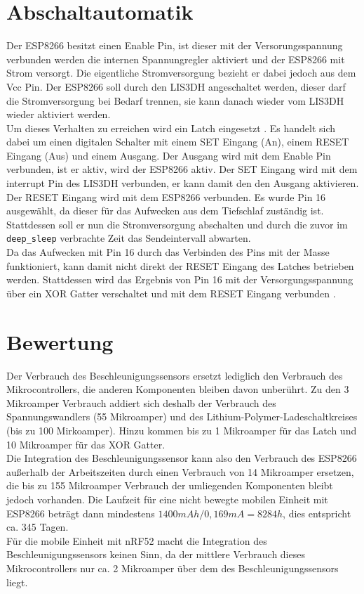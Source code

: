 \section{Abschaltautomatik}
\label{ch:Beschleunigungssensor:sec:Abschaltautomatik}
Der ESP8266 besitzt einen Enable Pin, ist dieser mit der Versorungsspannung verbunden werden die internen Spannungregler aktiviert und der ESP8266 mit Strom versorgt.
Die eigentliche Stromversorgung bezieht er dabei jedoch aus dem Vcc Pin.
Der ESP8266 soll durch den LIS3DH angeschaltet werden, dieser darf die Stromversorgung bei Bedarf trennen, sie kann danach wieder vom LIS3DH wieder aktiviert werden. \\
Um dieses Verhalten zu erreichen wird ein Latch eingesetzt \cite{texas2003latch}.
Es handelt sich dabei um einen digitalen Schalter mit einem SET Eingang (An), einem RESET Eingang (Aus) und einem Ausgang.
Der Ausgang wird mit dem Enable Pin verbunden, ist er aktiv, wird der ESP8266 aktiv.
Der SET Eingang wird mit dem interrupt Pin des LIS3DH verbunden, er kann damit den den Ausgang aktivieren.
Der RESET Eingang wird mit dem ESP8266 verbunden. 
Es wurde Pin 16 ausgewählt, da dieser für das Aufwecken aus dem Tiefschlaf zuständig ist. 
Stattdessen soll er nun die Stromversorgung abschalten und durch die zuvor im \texttt{deep\_sleep} verbrachte Zeit das Sendeintervall abwarten.\\
Da das Aufwecken mit Pin 16 durch das Verbinden des Pins mit der Masse funktioniert, kann damit nicht direkt der RESET Eingang des Latches betrieben werden.
Stattdessen wird das Ergebnis von Pin 16 mit der Versorgungsspannung über ein XOR Gatter verschaltet und mit dem RESET Eingang verbunden \cite{texas2014xor}.

\section{Bewertung}
Der Verbrauch des Beschleunigungssensors ersetzt lediglich den Verbrauch des Mikrocontrollers, die anderen Komponenten bleiben davon unberührt.
Zu den 3 Mikroamper Verbrauch addiert sich deshalb der Verbrauch des Spannungswandlers (55 Mikroamper) und des Lithium-Polymer-Ladeschaltkreises (bis zu 100 Mirkoamper).
Hinzu kommen bis zu 1 Mikroamper für das Latch und 10 Mikroamper für das XOR Gatter.\\
Die Integration des Beschleunigungssensor kann also den Verbrauch des ESP8266 außerhalb der Arbeitszeiten durch einen Verbrauch von 14 Mikroamper ersetzen, die bis zu 155 Mikroamper Verbrauch der umliegenden Komponenten bleibt jedoch vorhanden.
Die Laufzeit für eine nicht bewegte mobilen Einheit mit ESP8266 beträgt dann mindestens $1400mAh / 0,169mA = 8284h$, dies entspricht ca. 345 Tagen.\\
Für die mobile Einheit mit nRF52 macht die Integration des Beschleunigungssensors keinen Sinn, da der mittlere Verbrauch dieses Mikrocontrollers nur ca. 2 Mikroamper über dem des Beschleunigungssensors liegt.

